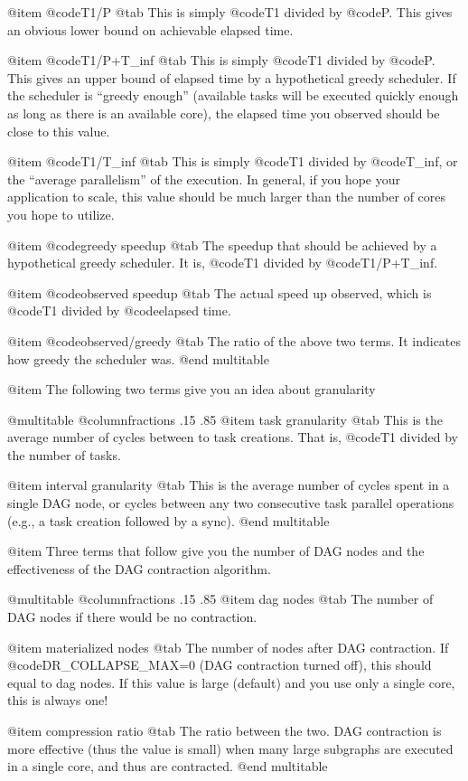 @item @code{T1/P} @tab 
This is simply @code{T1} divided by @code{P}. 
This gives an obvious lower bound on achievable elapsed time.

@item @code{T1/P+T_inf} @tab
This is simply @code{T1} divided by @code{P}. 
This gives an upper bound of elapsed time by a hypothetical greedy
scheduler.  If the scheduler is ``greedy enough'' (available tasks
will be executed quickly enough as long as there is an available core),
the elapsed time you observed should be close to this value.

@item @code{T1/T_inf} @tab
This is simply @code{T1} divided by @code{T_inf}, 
or the ``average parallelism'' of the execution.  In general, if you
hope your application to scale, this value should be much larger than
the number of cores you hope to utilize.

@item @code{greedy speedup} @tab 
The speedup that should be achieved
by a hypothetical greedy scheduler.  It is, @code{T1} divided
by @code{T1/P+T_inf}.

@item @code{observed speedup} @tab 
The actual speed up observed,
which is @code{T1} divided by @code{elapsed time}.

@item @code{observed/greedy} @tab 
The ratio of the above two terms.
It indicates how greedy the scheduler was.
@end multitable

@item The following two terms give you an idea about granularity

@multitable @columnfractions .15 .85
@item task granularity @tab 
This is the average number of cycles
between to task creations.  That is, @code{T1} divided by
the number of tasks.

@item interval granularity @tab
This is the average number of cycles spent in a single DAG node,
or cycles between any two consecutive
task parallel operations (e.g., a task creation followed by a sync).
@end multitable

@item Three terms that follow give you the number of DAG nodes
and the effectiveness of the DAG contraction algorithm.

@multitable @columnfractions .15 .85
@item dag nodes @tab 
The number of DAG nodes if there would be no 
contraction.

@item materialized nodes @tab 
The number of nodes after DAG contraction.
If @code{DR_COLLAPSE_MAX=0} (DAG contraction turned off), this should
equal to dag nodes.  If this value is large (default) and you use
only a single core, this is always one!

@item compression ratio @tab
The ratio between the two.  DAG contraction
is more effective (thus the value is small) when many large subgraphs
are executed in a single core, and thus are contracted.
@end multitable

